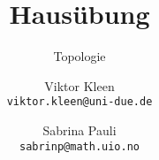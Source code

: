 \title{Hausübung \theSheet}
\subtitle{Topologie}
\author{\normalsize Viktor Kleen \\[-1ex] \texttt{\footnotesize viktor.kleen@uni-due.de} %
   \and \normalsize Sabrina Pauli \\[-1ex] \texttt{\footnotesize sabrinp@math.uio.no}}
\date{}

\newenvironment{identity}{}{}
